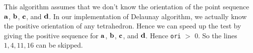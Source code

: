 This algorithm assumes that we don't know the orientation of the point sequence ${\bf a}$, ${\bf b}$, ${\bf c}$, and ${\bf d}$. In our implementation of Delaunay algorithm, we actually know the positive orientation of any tetrahedron. Hence we can speed up the test by giving the positive sequence for ${\bf a}$, ${\bf b}$, ${\bf c}$, and ${\bf d}$. Hence {\tt ori} $>$ 0. So the lines $1, 4, 11, 16$ can be skipped.
